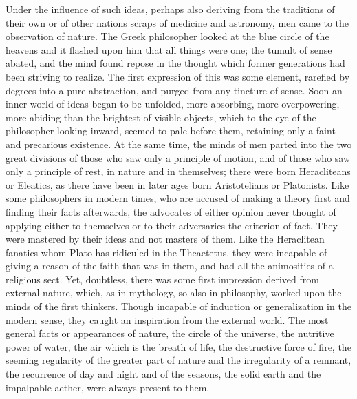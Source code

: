 \documentclass[11pt,letter]{article}
\begin{document}
\par  Under the influence of such ideas, perhaps also deriving from the traditions of their own or of other nations scraps of medicine and astronomy, men came to the observation of nature. The Greek philosopher looked at the blue circle of the heavens and it flashed upon him that all things were one; the tumult of sense abated, and the mind found repose in the thought which former generations had been striving to realize. The first expression of this was some element, rarefied by degrees into a pure abstraction, and purged from any tincture of sense. Soon an inner world of ideas began to be unfolded, more absorbing, more overpowering, more abiding than the brightest of visible objects, which to the eye of the philosopher looking inward, seemed to pale before them, retaining only a faint and precarious existence. At the same time, the minds of men parted into the two great divisions of those who saw only a principle of motion, and of those who saw only a principle of rest, in nature and in themselves; there were born Heracliteans or Eleatics, as there have been in later ages born Aristotelians or Platonists. Like some philosophers in modern times, who are accused of making a theory first and finding their facts afterwards, the advocates of either opinion never thought of applying either to themselves or to their adversaries the criterion of fact. They were mastered by their ideas and not masters of them. Like the Heraclitean fanatics whom Plato has ridiculed in the Theaetetus, they were incapable of giving a reason of the faith that was in them, and had all the animosities of a religious sect. Yet, doubtless, there was some first impression derived from external nature, which, as in mythology, so also in philosophy, worked upon the minds of the first thinkers. Though incapable of induction or generalization in the modern sense, they caught an inspiration from the external world. The most general facts or appearances of nature, the circle of the universe, the nutritive power of water, the air which is the breath of life, the destructive force of fire, the seeming regularity of the greater part of nature and the irregularity of a remnant, the recurrence of day and night and of the seasons, the solid earth and the impalpable aether, were always present to them.
\end{document}
